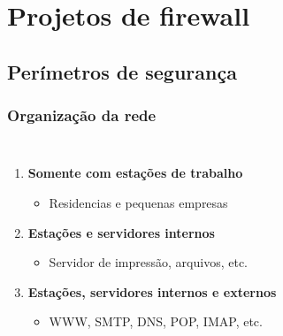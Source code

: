 \documentclass{beamer}
\begin{document}
\section{Projetos de firewall}

\subsection{Perímetros de segurança}

\begin{frame}
	\frametitle{Organização da rede}
	\begin{columns}


	\begin{enumerate}
		\item<1-|alert@1> \textbf{Somente com estações de trabalho}
		\begin{itemize}
			\item<1-|alert@1> Residencias e pequenas empresas
		\end{itemize}
		\item<2-|alert@2> \textbf{Estações e servidores internos}
		\begin{itemize}
			\item<2-|alert@2> Servidor de impressão, arquivos, etc.
		\end{itemize}
		\item<3-|alert@3> \textbf{Estações, servidores internos e externos}
		\begin{itemize}
			\item<3-|alert@3> WWW, SMTP, DNS, POP, IMAP, etc.
		\end{itemize}
	\end{enumerate}



\end{columns}
\end{frame}
\end{document}
